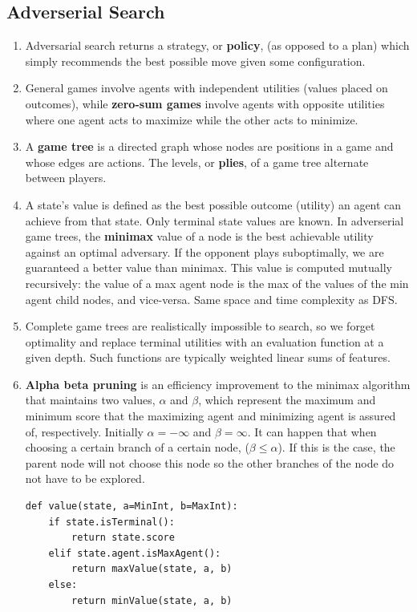 \documentclass[10pt]{article}
\begin{document}
\begin{multicols}{2}
\begin{addmargin}[0.8em]{0.5em}
    \subsection{Adverserial Search}
    \begin{enumerate}[label=(\alph*)]
        \item Adversarial search returns a strategy, or \textbf{policy}, (as opposed to a plan) which simply recommends the best possible move given some configuration.
        \item General games involve agents with independent utilities (values placed on outcomes), while \textbf{zero-sum games} involve agents with opposite utilities where one agent acts to maximize while the other acts to minimize.
        \item A \textbf{game tree} is a directed graph whose nodes are positions in a game and whose edges are actions. The levels, or \textbf{plies}, of a game tree alternate between players. 
        \item A state’s value is defined as the best possible outcome (utility) an agent can achieve from that state. Only terminal state values are known. In adverserial game trees, the \textbf{minimax} value of a node is the best achievable utility against an optimal adversary. If the opponent plays suboptimally, we are guaranteed a better value than minimax. This value is computed mutually recursively: the value of a max agent node is the max of the values of the min agent child nodes, and vice-versa. Same space and time complexity as DFS. 
        \item Complete game trees are realistically impossible to search, so we forget optimality and replace terminal utilities with an evaluation function at a given depth. Such functions are typically weighted linear sums of features.
        
        \item \textbf{Alpha beta pruning} is an efficiency improvement to the minimax algorithm that maintains two values, $\alpha$ and $\beta$, which represent the maximum and minimum score that the maximizing agent and minimizing agent is assured of, respectively. Initially $\alpha = - \infty$ and $\beta = \infty$. It can happen that when choosing a certain branch of a certain node, ($\beta \leq \alpha$). If this is the case, the parent node will not choose this node so the other branches of the node do not have to be explored.
        \begin{verbatim}
def value(state, a=MinInt, b=MaxInt):
    if state.isTerminal():
        return state.score
    elif state.agent.isMaxAgent():
        return maxValue(state, a, b)
    else:
        return minValue(state, a, b)


\end{verbatim}
\end{enumerate}
\end{addmargin}
\end{multicols}
\end{document}
